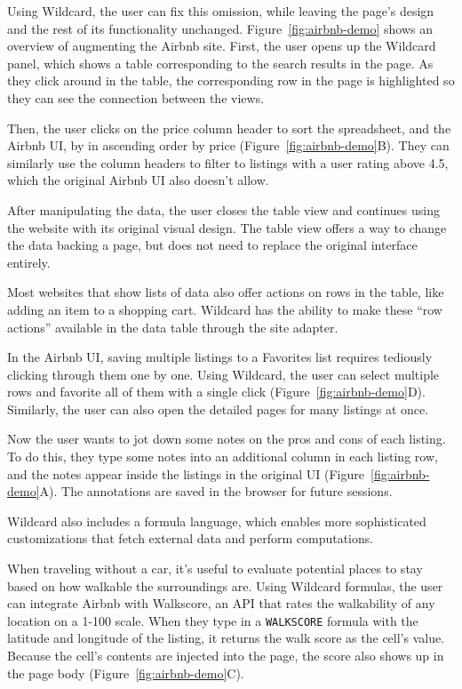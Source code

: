 \documentclass[english,submission]{programming}
\begin{document}
Using Wildcard, the user can fix this omission, while leaving the page's
design and the rest of its functionality unchanged.{
Figure~\ref{fig:airbnb-demo} shows an overview of augmenting the Airbnb
site.} First, the user opens up the Wildcard panel, which shows a table
corresponding to the search results in the page. As they click around in
the table, the corresponding row in the page is highlighted so they can
see the connection between the views.

Then, the user clicks on the price column header to sort the
spreadsheet, and the Airbnb UI, by in ascending order by price{
(Figure~\ref{fig:airbnb-demo}B)}. They can similarly use the column
headers to filter to listings with a user rating above 4.5, which the
original Airbnb UI also doesn't allow.

After manipulating the data, the user closes the table view and
continues using the website with its original visual design. The table
view offers a way to change the data backing a page, but does not need
to replace the original interface entirely.

Most websites that show lists of data also offer actions on rows in the
table, like adding an item to a shopping cart. Wildcard has the ability
to make these ``row actions'' available in the data table through the
site adapter.

In the Airbnb UI, saving multiple listings to a Favorites list requires
tediously clicking through them one by one. Using Wildcard, the user can
select multiple rows and favorite all of them with a single click{
(Figure~\ref{fig:airbnb-demo}D)}. Similarly, the user can also open the
detailed pages for many listings at once.

Now the user wants to jot down some notes on the pros and cons of each
listing. To do this, they type some notes into an additional column in
each listing row, and the notes appear inside the listings in the
original UI{ (Figure~\ref{fig:airbnb-demo}A)}. The annotations are saved
in the browser for future sessions.

Wildcard also includes a formula language, which enables more
sophisticated customizations that fetch external data and perform
computations.

When traveling without a car, it's useful to evaluate potential places
to stay based on how walkable the surroundings are. Using Wildcard
formulas, the user can integrate Airbnb with Walkscore, an API that
rates the walkability of any location on a 1-100 scale. When they type
in a \texttt{WALKSCORE} formula with the latitude and longitude of the
listing, it returns the walk score as the cell's value. Because the
cell's contents are injected into the page, the score also shows up in
the page body{ (Figure~\ref{fig:airbnb-demo}C)}.
\end{document}

